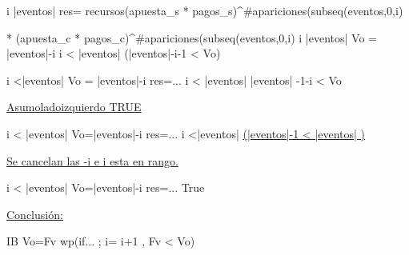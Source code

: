 \vspace{0.3cm}

\leq i \leq |eventos| \yLuego res= recursos(apuesta_s * pagos_s)^{\#apariciones(subseq(eventos,0,i)}

\vspace{0.2cm}
*\phantom{.} (apuesta_c * pagos_c)^{\#apariciones(subseq(eventos,0,i)} \wedge i \in |eventos| \wedge Vo = |eventos|-i \leq i < |eventos| \yLuego \phantom{...}\hspace{17}  
(|eventos|-i-1 < Vo)



\vspace{0.3cm}

\leq i <|eventos| \wedge Vo = |eventos|-i \wedge res=... \leq i < |eventos| \wedge |eventos| -1-i < Vo

\vspace{0.3cm}

\underline{Asumo\hspace{3}lado\hspace{3}izquierdo\hspace{3} TRUE}

\vspace{0.3cm}

\leq i < |eventos| \wedge Vo=|eventos|-i \wedge res=... \leq i <|eventos| \wedge \underline{(|eventos|-1  < |eventos| )} 

\vspace{0.3cm}

\underline{Se cancelan las -i e i esta en rango.}

\vspace{0.3cm}


\leq i < |eventos| \wedge Vo=|eventos|-i \wedge res=... \rightarrow True

\vspace{0.3cm}

\underline{Conclusi\'on:}
\vspace{0.2cm}

I\wedge B \wedge Vo=Fv \rightarrow wp(if... ; i= i+1 , Fv < Vo)


